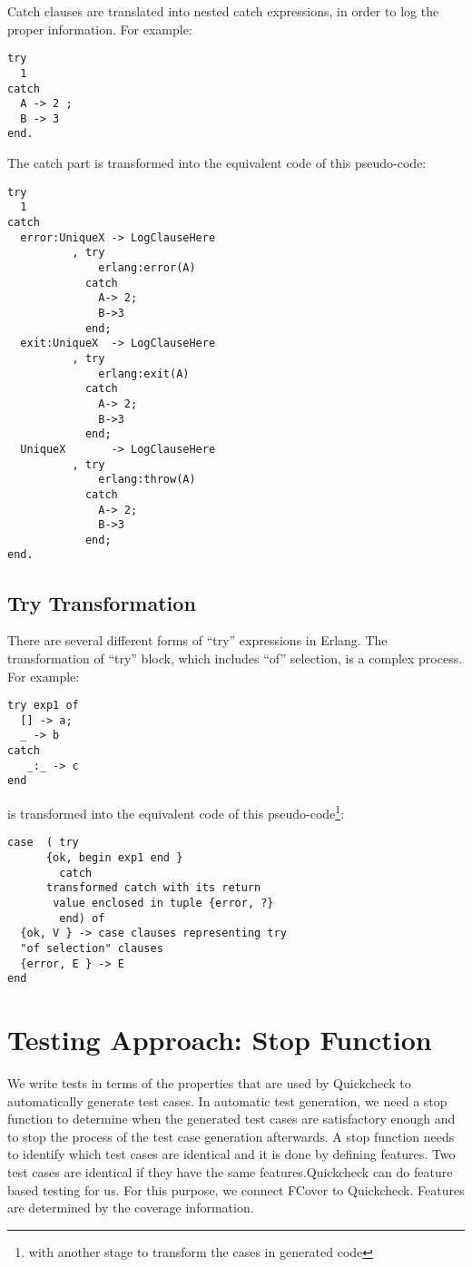\documentclass[12pt,a4paper]{report}
\begin{document}
Catch clauses are translated into nested catch expressions, in order to log the proper information. For example:

\begin{lstlisting}
try 
  1 
catch 
  A -> 2 ;
  B -> 3
end.
\end{lstlisting}

The catch part is transformed into the equivalent code of this pseudo-code:

\begin{lstlisting}
try 
  1 
catch
  error:UniqueX -> LogClauseHere
		  , try 
		      erlang:error(A) 
		    catch 
		      A-> 2;
		      B->3 
		    end;
  exit:UniqueX  -> LogClauseHere
		  , try
		      erlang:exit(A) 
		    catch 
		      A-> 2;
		      B->3 
		    end;
  UniqueX       -> LogClauseHere
		  , try 
		      erlang:throw(A) 
		    catch
		      A-> 2;
		      B->3
		    end;
end.
\end{lstlisting}

\subsection{Try Transformation}
There are several different forms of ``try'' expressions in Erlang. The transformation of ``try'' block, which includes ``of'' selection, is a complex process. For example:
\begin{lstlisting}
try exp1 of 
  [] -> a;
  _ -> b
catch
   _:_ -> c
end
\end{lstlisting}

is transformed into the equivalent code of this pseudo-code\footnote{with another stage to transform the cases in generated code}:

\begin{lstlisting}
case  ( try
	  {ok, begin exp1 end }
        catch        
	  transformed catch with its return
	   value enclosed in tuple {error, ?}
        end) of
  {ok, V } -> case clauses representing try
  "of selection" clauses
  {error, E } -> E
end
\end{lstlisting}

\section{Testing Approach: Stop Function}
We write tests in terms of the properties that are used by Quickcheck\cite{claessen2000quickcheck} to automatically generate test cases. In automatic test generation, we need a stop function to determine when the generated test cases are satisfactory enough and to stop the process of the test case generation afterwards. A stop function needs to identify which test cases are identical and it is done by defining features. Two test cases are identical if they have the same features.Quickcheck can do feature based testing for us. For this purpose, we connect FCover to Quickcheck. Features are determined by the coverage information.
\end{document}
